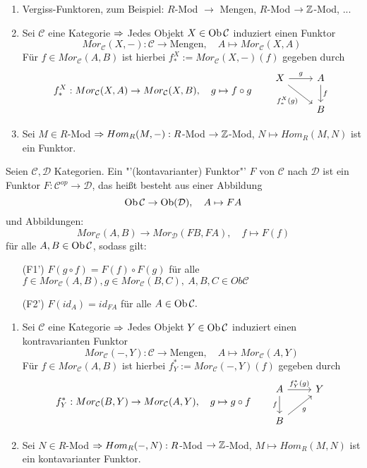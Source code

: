 \begin{bsp}
	\begin{enumerate} [label= \alph*)]
		\item Vergiss-Funktoren, zum Beispiel: $R$-Mod $\to $ Mengen, $R$-Mod $\to \mathbb{Z}$-Mod, ...
		\item Sei $\mathcal{C}$ eine Kategorie $\Rightarrow$ Jedes Objekt $X \in \text{Ob}\,\mathcal{C}$ induziert einen Funktor $$Mor_{\mathcal{C}}(X,-): \mathcal{C} \to \text{Mengen}, \quad A \mapsto Mor_{\mathcal{C}}(X,A) $$
		Für $f \in Mor_{\mathcal{C}}(A,B) $ ist hierbei $f_{\ast}^{X} := Mor_{\mathcal{C}}(X,-)(f)$ gegeben durch $$ f_{\ast}^{X}: Mor_{\mathcal{C}}(X,A) \to Mor_{\mathcal{C}}(X,B), \quad g \mapsto f \circ g\qquad \begin{tikzcd}
		X \arrow{r}{g} \arrow[swap]{rd}{f_*^X(g)} & A \arrow{d}{f} \\ & B
		\end{tikzcd} $$
		\item Sei $M \in R$-Mod $\Rightarrow Hom_R(M,-): R$-Mod $\to \mathbb{Z}$-Mod, $N \mapsto Hom_R(M,N) $ ist ein Funktor.
	\end{enumerate}
\end{bsp}
\begin{df}
	Seien $\mathcal{C}, \mathcal{D}$ Kategorien. Ein "'(kontavarianter) Funktor"' $F$ von $\mathcal{C}$ nach $\mathcal{D}$ ist ein Funktor $F: \mathcal{C}^{op} \to \mathcal{D} $, das heißt besteht aus einer Abbildung $$ \text{Ob}\,\mathcal{C} \to \text{Ob}(\mathcal{D}), \quad A \mapsto FA$$
	und Abbildungen: $$ Mor_{\mathcal{C}}(A,B) \to Mor_{\mathcal{D}}(FB,FA), \quad f \mapsto F(f) $$ für alle $A,B \in \text{Ob}\,\mathcal{C}$, sodass gilt:
	\begin{enumerate}
		\item[(F1')] $F(g \circ f) = F(f) \circ F(g) $ für alle $ f \in Mor_{\mathcal{C}}(A,B), g\in Mor_{\mathcal{C}}(B,C), \ A,B,C \in Ob\mathcal{C}$
		\item[(F2')] $F(id_A) =id_{FA} $ für alle $A \in \text{Ob}\,\mathcal{C}.$
	\end{enumerate}
\end{df}
\begin{bsp}
		\begin{enumerate} [label= \alph*)]
		\item Sei $\mathcal{C}$ eine Kategorie $\Rightarrow$ Jedes Objekt $Y \in \text{Ob}\,\mathcal{C}$ induziert einen kontravarianten Funktor $$Mor_{\mathcal{C}}(-,Y): \mathcal{C} \to \text{Mengen}, \quad A \mapsto Mor_{\mathcal{C}}(A,Y) $$
		Für $f \in Mor_{\mathcal{C}}(A,B) $ ist hierbei $f_{Y}^{\ast} := Mor_{\mathcal{C}}(-,Y)(f)$ gegeben durch $$ f_{Y}^{\ast}: Mor_{\mathcal{C}}(B,Y) \to Mor_{\mathcal{C}}(A,Y), \quad g \mapsto g \circ f\qquad \begin{tikzcd}
		A \arrow{r}{f_Y^*(g)} \arrow[swap]{d}{f} & Y \\B \arrow[swap]{ur}{g}
		\end{tikzcd}$$
		\item Sei $N \in R$-Mod $\Rightarrow Hom_R(-,N): R$-Mod $\to \mathbb{Z}$-Mod, $M \mapsto Hom_R(M,N) $ ist ein kontavarianter Funktor.
	\end{enumerate}
\end{bsp}

